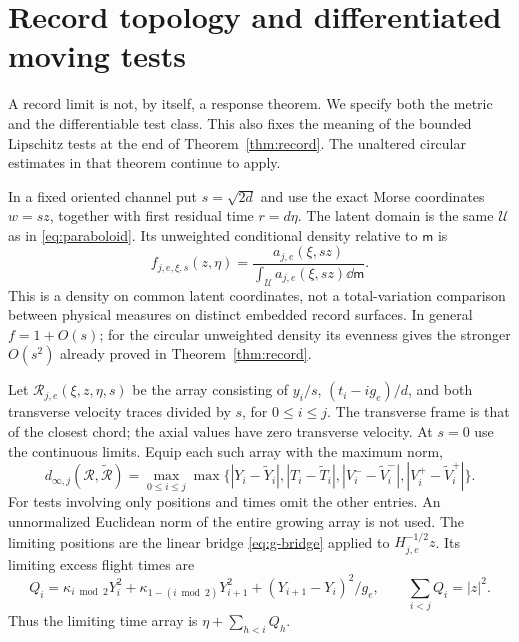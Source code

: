 \section{Record topology and differentiated moving tests}
\label{sec:g-record-response}
A record limit is not, by itself, a response theorem. We specify both the
metric and the differentiable test class. This also fixes the meaning of
the bounded Lipschitz tests at the end of Theorem~\ref{thm:record}.
The unaltered circular estimates in that theorem continue to apply.

In a fixed oriented channel put $s=\sqrt{2d}$ and use the exact Morse
coordinates $w=sz$, together with first residual time $r=d\eta$.
The latent domain is the same $\mathcal U$ as in \eqref{eq:paraboloid}.
Its unweighted conditional density relative to $\mathsf m$ is
\begin{equation}\label{eq:g-latent-density}
 f_{j,e,\xi,s}(z,\eta)=
 \frac{a_{j,e}(\xi,sz)}{\displaystyle\int_{\mathcal U}
                         a_{j,e}(\xi,sz)\dd\mathsf m}.
\end{equation}
This is a density on common latent coordinates, not a total-variation
comparison between physical measures on distinct embedded record surfaces.
In general $f=1+O(s)$; for the circular unweighted density its evenness
gives the stronger $O(s^2)$ already proved in Theorem~\ref{thm:record}.

Let $\mathcal R_{j,e}(\xi,z,\eta,s)$ be the array consisting of
$y_i/s$, $(t_i-ig_e)/d$, and both transverse velocity traces divided
by $s$, for $0\le i\le j$. The transverse frame is that of the closest
chord; the axial values have zero transverse velocity. At $s=0$ use
the continuous limits. Equip each such array with the maximum norm,
\begin{equation}\label{eq:g-record-metric}
 d_{\infty,j}(\mathcal R,\widetilde{\mathcal R})
 =\max_{0\le i\le j}
    \max\{|Y_i-\widetilde Y_i|,|T_i-\widetilde T_i|,
          |V_i^--\widetilde V_i^-|,|V_i^+-\widetilde V_i^+|\}.
\end{equation}
For tests involving only positions and times omit the other entries.
An unnormalized Euclidean norm of the entire growing array is not used.
The limiting positions are the linear bridge \eqref{eq:g-bridge} applied
to $H_{j,e}^{-1/2}z$. Its limiting excess flight times are
\[
 Q_i=\kappa_{i\bmod2}Y_i^2+\kappa_{1-(i\bmod2)}Y_{i+1}^2
                          +(Y_{i+1}-Y_i)^2/g_e,
 \qquad \sum_{i<j}Q_i=|z|^2.
\]
Thus the limiting time array is $\eta+\sum_{h<i}Q_h$.

